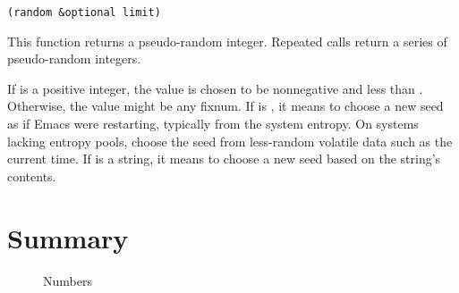 \begin{lstlisting}
(random &optional limit)
\end{lstlisting}
This function returns a pseudo-random integer.
Repeated calls return a series of pseudo-random integers.

If  is a positive integer, the value is chosen to be nonnegative and less than .
Otherwise, the value might be any fixnum.
If  is , it means to choose a new seed as if Emacs were restarting, typically from the system entropy.
On systems lacking entropy pools, choose the seed from less-random volatile data such as the current time.
If  is a string, it means to choose a new seed based on the string’s contents.


\section{Summary}
\label{sec:summary-1}

\begin{figure}[H]
  \centering
  \caption{Numbers}
\end{figure}


